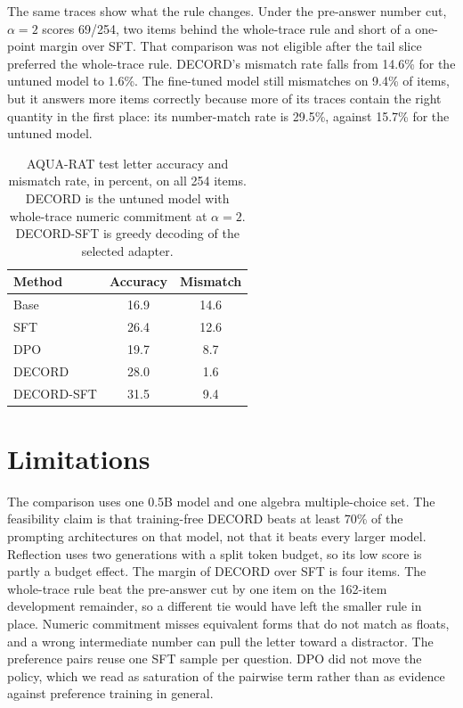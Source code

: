 \documentclass[11pt]{article}
\begin{document}
The same traces show what the rule changes.
Under the pre-answer number cut, \(\alpha=2\) scores 69/254, two items behind the whole-trace rule and short of a one-point margin over SFT.
That comparison was not eligible after the tail slice preferred the whole-trace rule.
DECORD's mismatch rate falls from 14.6\% for the untuned model to 1.6\%.
The fine-tuned model still mismatches on 9.4\% of items, but it answers more items correctly because more of its traces contain the right quantity in the first place: its number-match rate is 29.5\%, against 15.7\% for the untuned model.

\begin{table}[t]
\centering
\small
\begin{tabular}{lcc}
\toprule
Method & Accuracy & Mismatch \\
\midrule
Base & 16.9 & 14.6 \\
SFT & 26.4 & 12.6 \\
DPO & 19.7 & 8.7 \\
DECORD & 28.0 & 1.6 \\
DECORD-SFT & 31.5 & 9.4 \\
\bottomrule
\end{tabular}
\caption{AQUA-RAT test letter accuracy and mismatch rate, in percent, on all 254 items. DECORD is the untuned model with whole-trace numeric commitment at \(\alpha=2\). DECORD-SFT is greedy decoding of the selected adapter.}
\label{tab:main}
\end{table}

\section{Limitations}

The comparison uses one 0.5B model and one algebra multiple-choice set.
The feasibility claim is that training-free DECORD beats at least 70\% of the prompting architectures on that model, not that it beats every larger model.
Reflection uses two generations with a split token budget, so its low score is partly a budget effect.
The margin of DECORD over SFT is four items.
The whole-trace rule beat the pre-answer cut by one item on the 162-item development remainder, so a different tie would have left the smaller rule in place.
Numeric commitment misses equivalent forms that do not match as floats, and a wrong intermediate number can pull the letter toward a distractor.
The preference pairs reuse one SFT sample per question.
DPO did not move the policy, which we read as saturation of the pairwise term rather than as evidence against preference training in general.


\end{document}
